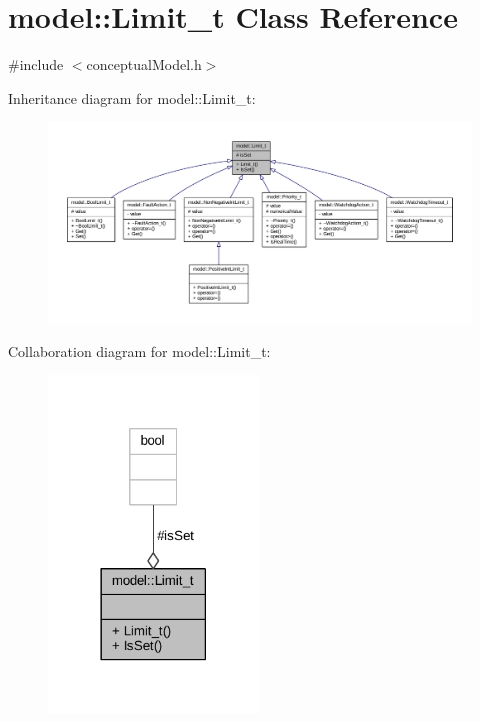 \hypertarget{classmodel_1_1_limit__t}{}\section{model\+:\+:Limit\+\_\+t Class Reference}
\label{classmodel_1_1_limit__t}


{\ttfamily \#include $<$conceptual\+Model.\+h$>$}



Inheritance diagram for model\+:\+:Limit\+\_\+t\+:
\nopagebreak
\begin{figure}[H]
\begin{center}
\leavevmode
\includegraphics[width=350pt]{classmodel_1_1_limit__t__inherit__graph}
\end{center}
\end{figure}


Collaboration diagram for model\+:\+:Limit\+\_\+t\+:
\nopagebreak
\begin{figure}[H]
\begin{center}
\leavevmode
\includegraphics[width=158pt]{classmodel_1_1_limit__t__coll__graph}
\end{center}
\end{figure}
